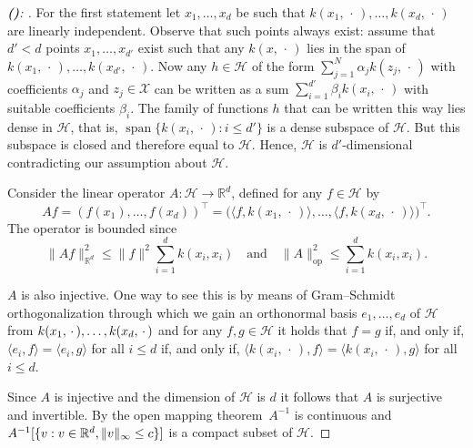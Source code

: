 \documentclass[AHL,Unicode,longabstracts,published]{cedram}
\theoremstyle{remark}
\DeclareMathOperator{\spn}{span}
\DeclareMathOperator{\opp}{op}
\newcommand{\R}{\mathbb{R}}
\newcommand{\X}{\mathcal{X}}
\newcommand{\cH}{\mathcal{H}}
\newcounter{setofstep}
\newcounter{step}[setofstep]
\newenvironment{step}[1][]{\refstepcounter{step}\begin{proof}[{\textbf{(\thestep)}\if#1\empty\else: #1\fi}]}{\let\qed\relax\end{proof}}
\renewcommand{\thestep}{\alph{step}}
\begin{document}
\begin{proofc}

\begin{step}
For the first statement let $x_1,\dots, x_d$ be such that $k(x_1,\,\cdot\,), \dots, k(x_d,\,\cdot\,)$ are linearly independent. Observe that such points always exist: assume that $d' < d$ points $x_1,\dots, x_{d'}$ exist such that any $k(x,\,\cdot\,)$ lies in the span of $k(x_1,\,\cdot\,),\dots, k(x_{d'}, \,\cdot\,)$. Now any $h \in \cH$ of the form $\sum_{j=1}^N \alpha_j k(z_j,\,\cdot\,)$ with coefficients $\alpha_j$ and $z_j \in \X$ can be written as a sum $\sum_{i=1}^{d'} \beta_i k(x_i,\,\cdot\,)$ with suitable coefficients $\beta_i$. The family of functions $h$ that can be written this way lies dense in $\cH$, that is, $\spn \{k(x_i,\,\cdot\,) : i \leq d' \}$ is a dense subspace of $\cH$. But this subspace is closed and therefore equal to $\cH$. Hence, $\cH$ is $d'$-dimensional contradicting our assumption about $\cH$.

Consider the linear operator $A:\cH \rightarrow \R^d$, defined for any $f\in \cH$ by
\[
A f = (f(x_1), \dots, f(x_d))^\top = \bigl(\langle f,k(x_1,\,\cdot\,) \rangle, \dots, \langle f,k(x_d,\,\cdot\,) \rangle\bigr)^\top.
\]
The operator is bounded since
\[
\|A f\|^2_{\R^d} \leq \|f\|^2 \sum_{i=1}^d k(x_i,x_i)\quad\text{and}\quad \|A\|^2_{\opp} \leq \sum_{i=1}^d k(x_i,x_i).
\]

$A$ is also injective. One way to see this is by means of Gram--Schmidt orthogonalization through which we gain an orthonormal basis $e_1,\dots, e_d$ of $\cH$ from $k(x_1,\,\cdot\,), \dots,\linebreak k(x_d,\,\cdot\,)$ and for any $f,g \in \cH$ it holds that $f=g$ if, and only if, $\langle e_i,f\rangle = \langle e_i, g \rangle $ for all $i\leq d$ if, and only if, $\langle k(x_i,\,\cdot\,), f\rangle = \langle k(x_i, \,\cdot\,), g \rangle $ for all $i\leq d$.

Since $A$ is injective and the dimension of $\cH$ is $d$ it follows that $A$ is surjective and invertible. By the open mapping theorem~$A^{-1}$ is continuous and $A^{-1}[\{v : v\in \R^d,\linebreak \|v\|_\infty \leq c \}]$ is a compact subset of $\cH$.
\let\qed\relax
\end{step}


\end{proofc}
\end{document}
